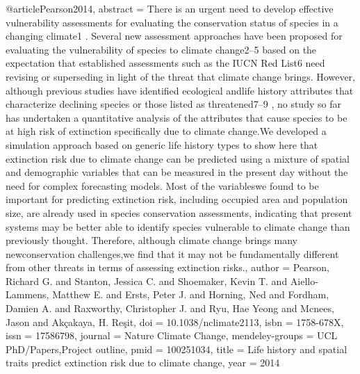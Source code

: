 {{@article{Pearson2014,
abstract = {There is an urgent need to develop effective vulnerability assessments for evaluating the conservation status of species in a changing climate1 . Several new assessment approaches have been proposed for evaluating the vulnerability of species to climate change2–5 based on the expectation that established assessments such as the IUCN Red List6 need revising or superseding in light of the threat that climate change brings. However, although previous studies have identified ecological andlife history attributes that characterize declining species or those listed as threatened7–9 , no study so far has undertaken a quantitative analysis of the attributes that cause species to be at high risk of extinction specifically due to climate change.We developed a simulation approach based on generic life history types to show here that extinction risk due to climate change can be predicted using a mixture of spatial and demographic variables that can be measured in the present day without the need for complex forecasting models. Most of the variableswe found to be important for predicting extinction risk, including occupied area and population size, are already used in species conservation assessments, indicating that present systems may be better able to identify species vulnerable to climate change than previously thought. Therefore, although climate change brings many newconservation challenges,we find that it may not be fundamentally different from other threats in terms of assessing extinction risks.},
author = {Pearson, Richard G. and Stanton, Jessica C. and Shoemaker, Kevin T. and Aiello-Lammens, Matthew E. and Ersts, Peter J. and Horning, Ned and Fordham, Damien A. and Raxworthy, Christopher J. and Ryu, Hae Yeong and Mcnees, Jason and Ak{\c{c}}akaya, H. Reşit},
doi = {10.1038/nclimate2113},
isbn = {1758-678X},
issn = {17586798},
journal = {Nature Climate Change},
mendeley-groups = {UCL PhD/Papers,Project outline},
pmid = {100251034},
title = {{Life history and spatial traits predict extinction risk due to climate change}},
year = {2014}
}

}}
